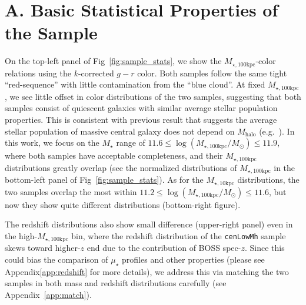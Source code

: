 \documentclass[a4paper,fleqn,usenatbib]{mnras}
\def\nbcg{\texttt{cenLowMh}}
\def\mstar{{$M_{\star}$}}
\def\mhalo{{$M_{\mathrm{halo}}$}}
\def\minn{{$M_{\star,10\mathrm{kpc}}$}}
\def\mtot{{$M_{\star,100\mathrm{kpc}}$}}
\def\logmtot{{$\log (M_{\star,100\mathrm{kpc}}/M_{\odot})$}}
\def\mden{{$\mu_{\star}$}}
\begin{document}
\section{A. Basic Statistical Properties of the Sample} 
	\label{app:sedasic} 
    
    On the top-left panel of Fig~\ref{fig:sample_stats}, we show the \mtot{}-color 
    relations using the $k$-corrected $g-r$ color. 
    Both samples follow the same tight ``red-sequence'' with little contamination 
    from the ``blue cloud''.
    At fixed \mtot{}, we see little offset in color distributions of the two 
    samples, suggesting that both samples consist of quiescent galaxies with 
    similar average stellar population properties.  
    This is consistent with previous result that suggests the average stellar 
    population of massive central galaxy does not depend on \mhalo{} 
    (e.g.\ \citealt{Park2007}).  
    In this work, we focus on the \mstar{} range of $11.6 \le$\logmtot{}$\le 11.9$, 
    where both samples have acceptable completeness, and their \mtot{} distributions 
    greatly overlap (see the normalized distributions of \mtot{} in the bottom-left 
    panel of Fig~\ref{fig:sample_stats}). 
    As for the \minn{} distributions, the two samples overlap the most within 
    $11.2 \le$\logmtot{}$\le 11.6$, but now they show quite different
    distributions (bottom-right figure).
    
    The redshift distributions also show small difference
    (upper-right panel) even in the high-\mtot{} bin, where the redshift distribution 
    of the \nbcg{} sample skews toward higher-$z$ end due to the contribution of BOSS 
    spec-$z$.
    Since this could bias the comparison of \mden{} profiles and other properties 
    (please see Appendix\ref{app:redshift} for more details), we address this via matching 
    the two samples in both mass and redshift distributions carefully
    (see Appendix~\ref{app:match}).
    
\end{document}
